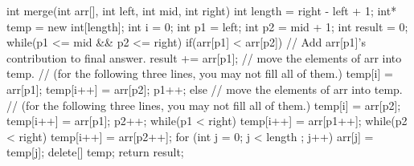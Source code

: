 \begin{parts}
    \begin{cpp}
        int merge(int arr[], int left, int mid, int right){
                int length = right - left + 1;
                int* temp = new int[length];
                int i = 0;
                int p1 = left;
                int p2 = mid + 1;
                int result = 0;
                while(p1 <= mid && p2 <= right){
                        if(arr[p1] < arr[p2]){
                                // Add arr[p1]'s contribution to final answer.
                                result += arr[p1];
                                // move the elements of arr into temp.
                                // (for the following three lines, you may not fill all of them.)
                                temp[i] = arr[p1];
                                temp[i++] = arr[p2];
                                p1++;
                            }
                        else{
                                // move the elements of arr into temp.
                                // (for the following three lines, you may not fill all of them.)
                                temp[i] = arr[p2];
                                temp[i++] = arr[p1];
                                p2++;
                            }
                    }
                while(p1 < right){
                        temp[i++] = arr[p1++];
                    }
                while(p2 < right){
                        temp[i++] = arr[p2++];
                    }
                for (int j = 0; j < length ; j++){
                        arr[j] = temp[j];
                    }
                delete[] temp;
                return result;
            }
    \end{cpp}



\end{parts}
